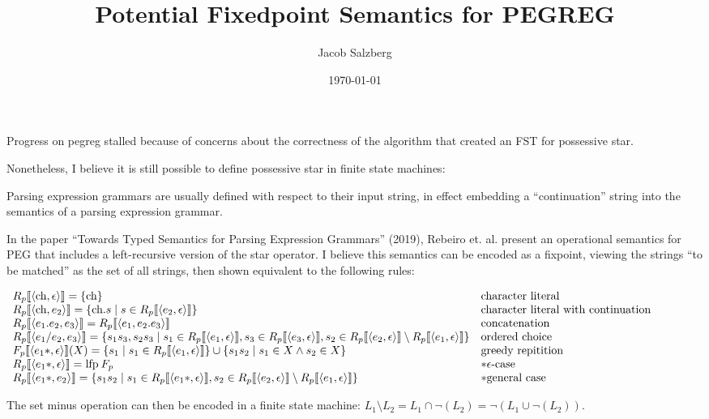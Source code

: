 \documentclass[10pt]{article}
\author {Jacob Salzberg}
\date{\today}
\title{Potential Fixedpoint Semantics for PEGREG}
\newcommand{\lfp}{{\kern-0.20em}\mathbin{\mbox{lfp}}}
\begin{document}
\maketitle

Progress on pegreg stalled because of concerns about the correctness of the algorithm that created an FST for possessive star.

Nonetheless, I believe it is still possible to define possessive star in finite state machines:

Parsing expression grammars are usually defined with respect to their input string, in effect embedding a ``continuation'' string into the semantics of a parsing expression grammar.

In the paper ``Towards Typed Semantics for Parsing Expression Grammars'' (2019), Rebeiro et. al. present an operational semantics for PEG that includes a left-recursive version of the
star operator. I believe this semantics can be encoded as a fixpoint, viewing the strings ``to be matched'' as the set of all strings, then shown equivalent to the following rules:

\begin{center}
$
  \begin{array}{l l}
    R_p \llbracket \langle \mbox{ch}, \epsilon \rangle \rrbracket = \{ \mbox{ch} \} & \mbox{character literal} \\
    R_p \llbracket \langle \mbox{ch}, e_2 \rangle \rrbracket = \{ \mbox{ch}.s \mid s \in R_p \llbracket \langle e_2, \epsilon \rangle \rrbracket \} & \mbox{character literal with continuation} \\
    R_p \llbracket \langle e_1.e_2, e_3 \rangle \rrbracket = R_p \llbracket \langle e_1, e_2.e_3 \rangle \rrbracket & \mbox{concatenation} \\
    R_p \llbracket \langle e_1/e_2, e_3 \rangle \rrbracket = \{ s_1s_3, s_2s_3 \mid s_1 \in R_p \llbracket \langle e_1, \epsilon \rangle \rrbracket, s_3 \in R_p \llbracket \langle e_3, \epsilon \rangle \rrbracket, s_2 \in R_p \llbracket \langle e_2, \epsilon \rangle \rrbracket \setminus R_p \llbracket \langle e_1, \epsilon \rangle \rrbracket \} & \mbox{ordered choice} \\
    F_p \llbracket \langle e_1\ast, \epsilon \rangle \rrbracket(X) = \{s_1 \mid s_1 \in R_p \llbracket \langle e_1, \epsilon \rangle \rrbracket \} \cup \{s_1s_2 \mid s_1 \in X \land s_2 \in X \} & \mbox{greedy repitition} \\
    R_p \llbracket \langle e_1\ast, \epsilon\rangle \rrbracket = \lfp F_p & \ast \epsilon\mbox{-case} \\
    R_p \llbracket \langle e_1\ast, e_2 \rangle \rrbracket = \{s_1s_2 \mid s_1 \in R_p \llbracket \langle e_1\ast, \epsilon \rangle \rrbracket, s_2 \in R_p \llbracket \langle e_2, \epsilon \rangle \rrbracket \setminus R_p \llbracket \langle e_1, \epsilon \rangle \rrbracket \} & \ast \mbox{general case} \\
  \end{array}
$
\end{center}

The set minus operation can then be encoded in a finite state machine: $L_1 \setminus L_2 = L_1 \cap \neg(L_2) = \neg(L_1 \cup \neg(L_2))$.
\end{document}
